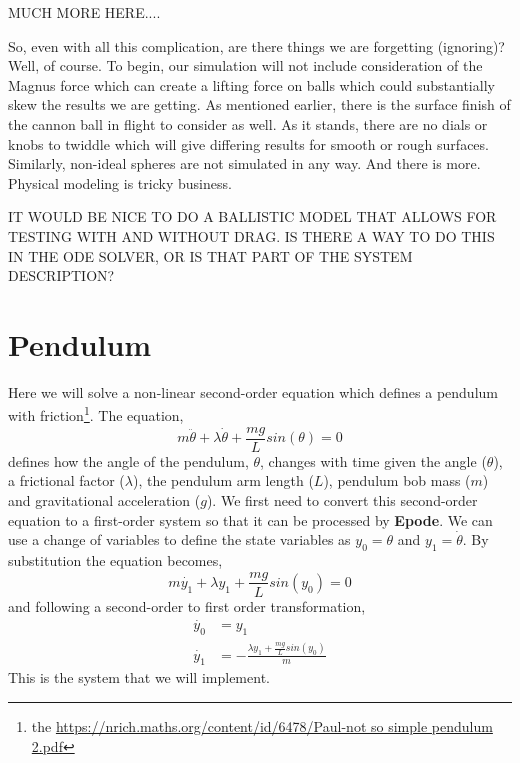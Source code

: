 \documentclass[letterpaper,10pt]{book}
\newcommand{\epode}[0]{\textbf{Epode}}
\begin{document}
      MUCH MORE HERE....
      
      So, even with all this complication, are there things we are forgetting (ignoring)?  Well, of course.  To begin, our simulation will not include consideration of the Magnus force which can create a lifting force on balls which could substantially skew the results we are getting.  As mentioned earlier, there is the surface finish of the cannon ball in flight to consider as well.  As it stands, there are no dials or knobs to twiddle which will give differing results for smooth or rough surfaces.  Similarly, non-ideal spheres are not simulated in any way.  And there is more.  Physical modeling is tricky business.
      
      IT WOULD BE NICE TO DO A BALLISTIC MODEL THAT ALLOWS FOR TESTING WITH AND WITHOUT DRAG.  IS THERE A WAY TO DO THIS IN THE ODE SOLVER, OR IS THAT PART OF THE SYSTEM DESCRIPTION?

    \section{Pendulum}
      Here we will solve a non-linear second-order equation which defines a pendulum with friction\footnote{the \url{https://nrich.maths.org/content/id/6478/Paul-not so simple pendulum 2.pdf}}.  The equation,
      \begin{equation}
	m\ddot{\theta} + \lambda\dot{\theta} + \frac{m g}{L}sin(\theta) = 0
      \end{equation}
      defines how the angle of the pendulum, $\theta$, changes with time given the angle ($\theta$), a frictional factor ($\lambda$), the pendulum arm length ($L$), pendulum bob mass ($m$) and gravitational acceleration ($g$).  We first need to convert this second-order equation to a first-order system so that it can be processed by \epode{}.  We can use a change of variables to define the state variables as $y_{0} = \theta$ and $y_{1} = \dot{\theta}$.  By substitution the equation becomes,
      \begin{equation}
	m\dot{y_1} + \lambda{}y_1 + \frac{m g}{L}sin(y_0) = 0
      \end{equation}
      and following a second-order to first order transformation,
      \begin{equation}
	\begin{aligned}
	  \dot{y_0} &= y_{1}\\
	  \dot{y_1} &= -\frac{\lambda{}y_{1} + \frac{m g}{L}sin(y_0)}{m}
	\end{aligned}
      \end{equation}
      This is the system that we will implement.
      
\end{document}

